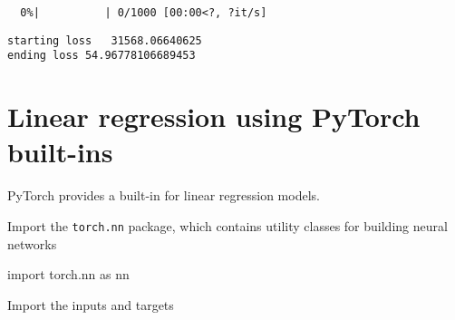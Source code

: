 \documentclass[
  letterpaper,
  DIV=11,
  numbers=noendperiod]{scrartcl}
\newenvironment{Shaded}{\begin{snugshade}}{\end{snugshade}}
\newcommand{\ImportTok}[1]{\textcolor[rgb]{0.00,0.46,0.62}{#1}}
\newcommand{\NormalTok}[1]{\textcolor[rgb]{0.00,0.23,0.31}{#1}}
\begin{document}
\begin{verbatim}
  0%|          | 0/1000 [00:00<?, ?it/s]
\end{verbatim}

\begin{verbatim}
starting loss   31568.06640625
ending loss 54.96778106689453
\end{verbatim}

\hypertarget{linear-regression-using-pytorch-built-ins}{%
\section{Linear regression using PyTorch
built-ins}\label{linear-regression-using-pytorch-built-ins}}

PyTorch provides a built-in for linear regression models.

Import the \texttt{torch.nn} package, which contains utility classes for
building neural networks

\begin{Shaded}
\begin{Highlighting}[]
\ImportTok{import}\NormalTok{ torch.nn }\ImportTok{as}\NormalTok{ nn}
\end{Highlighting}
\end{Shaded}

Import the inputs and targets
\end{document}
